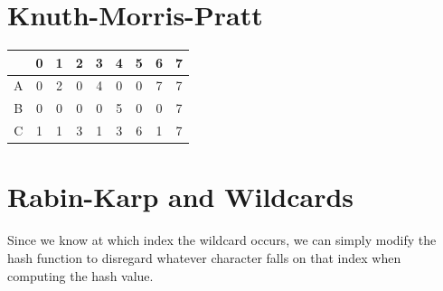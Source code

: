 \documentclass{article}
\begin{document}
\section{Knuth-Morris-Pratt}
\begin{minipage}{.5\textwidth}

\end{minipage}
\begin{center}
	\begin{tabular}{c|cccccccc}
		&0&1&2&3&4&5&6&7 \\
		\toprule
		A&0&2&0&4&0&0&7&7 \\
		B&0&0&0&0&5&0&0&7 \\
		C&1&1&3&1&3&6&1&7 \\
		\bottomrule
	\end{tabular}
\end{center}
\section{Rabin-Karp and Wildcards}
Since we know at which index the wildcard occurs, we can simply modify the hash
function to disregard whatever character falls on that index when computing the hash value.
\end{document}
